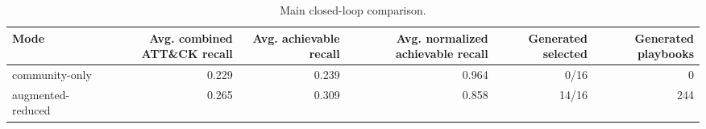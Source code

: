 \begin{table}[tb]
\centering
\caption{Main closed-loop comparison.}
\label{tab:main\_closed\_loop\_comparison}
\begin{tabular}{lrrrrr}
\toprule
Mode & Avg. combined ATT\&CK recall & Avg. achievable recall & Avg. normalized achievable recall & Generated selected & Generated playbooks \\
\midrule
community-only & 0.229 & 0.239 & 0.964 & 0/16 & 0 \\
augmented-reduced & 0.265 & 0.309 & 0.858 & 14/16 & 244 \\
\bottomrule
\end{tabular}
\end{table}
